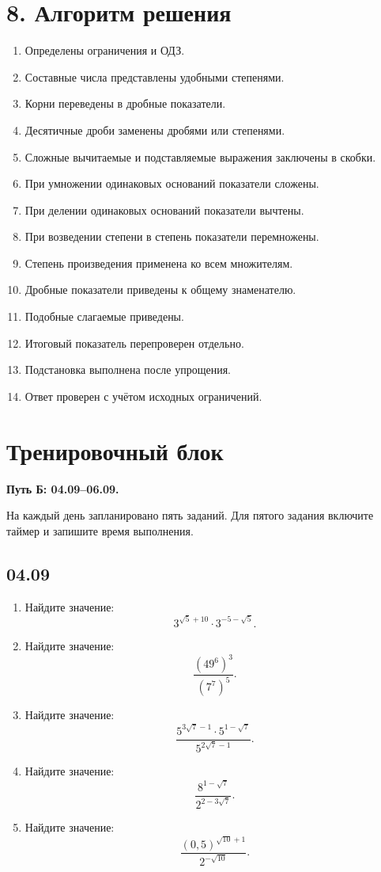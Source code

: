 \documentclass[a4paper,12pt]{article}
\newcommand{\checkitem}{\(\square\)\;}
\begin{document}
\section*{8. Алгоритм решения}
\begin{enumerate}[label=\checkitem]
\item Определены ограничения и ОДЗ.
\item Составные числа представлены удобными степенями.
\item Корни переведены в дробные показатели.
\item Десятичные дроби заменены дробями или степенями.
\item Сложные вычитаемые и подставляемые выражения заключены в скобки.
\item При умножении одинаковых оснований показатели сложены.
\item При делении одинаковых оснований показатели вычтены.
\item При возведении степени в степень показатели перемножены.
\item Степень произведения применена ко всем множителям.
\item Дробные показатели приведены к общему знаменателю.
\item Подобные слагаемые приведены.
\item Итоговый показатель перепроверен отдельно.
\item Подстановка выполнена после упрощения.
\item Ответ проверен с учётом исходных ограничений.
\end{enumerate}

\clearpage
\section*{Тренировочный блок}
\textbf{Путь Б: 04.09--06.09.}\par
На каждый день запланировано пять заданий. Для пятого задания включите таймер и запишите время выполнения.

\subsection*{04.09}
\begin{enumerate}[label=\textbf{\arabic*.}]
\item Найдите значение: \[3^{\sqrt5+10}\cdot3^{-5-\sqrt5}.\]
\item Найдите значение: \[\frac{(49^6)^3}{(7^7)^5}.\]
\item Найдите значение: \[\frac{5^{3\sqrt7-1}\cdot5^{1-\sqrt7}}{5^{2\sqrt7-1}}.\]
\item Найдите значение: \[\frac{8^{1-\sqrt7}}{2^{2-3\sqrt7}}.\]
\item Найдите значение: \[\frac{(0{,}5)^{\sqrt{10}+1}}{2^{-\sqrt{10}}}.\]
\end{enumerate}
\end{document}
